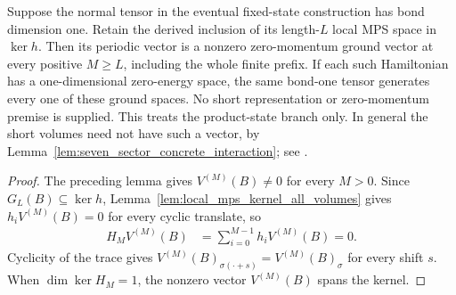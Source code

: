 \begin{lemma}
    \label{lem:spwc_bond_one_finite_prefix_ground}
    \leanok
    Suppose the normal tensor in the eventual fixed-state construction
    has bond dimension one. Retain the derived inclusion of its
    length-$L$ local MPS space in $\ker h$. Then its periodic
    vector is a nonzero zero-momentum ground vector at every positive
    $M\geq L$, including the whole finite prefix. If each such
    Hamiltonian has a one-dimensional zero-energy space, the same
    bond-one tensor generates every one of these ground spaces.
    No short representation or zero-momentum premise is supplied.
    This treats the product-state branch only. In general the short
    volumes need not have such a vector, by
    Lemma~\ref{lem:seven_sector_concrete_interaction}; see
    \cite{gap:spwc10_ground_state_dichotomy_quantifiers}.
\end{lemma}
\begin{proof}\leanok
    The preceding lemma gives $V^{(M)}(B)\ne0$ for every $M>0$. Since
    $G_L(B)\subseteq\ker h$, Lemma~\ref{lem:local_mps_kernel_all_volumes}
    gives $h_iV^{(M)}(B)=0$ for every cyclic translate, so
    \begin{align}
        H_MV^{(M)}(B) & =\sum_{i=0}^{M-1}h_iV^{(M)}(B)=0.
    \end{align}
    Cyclicity of the trace gives
    $V^{(M)}(B)_{\sigma(\cdot+s)}=V^{(M)}(B)_\sigma$ for every shift $s$.
    When $\dim\ker H_M=1$, the nonzero vector $V^{(M)}(B)$ spans the
    kernel.
\end{proof}

